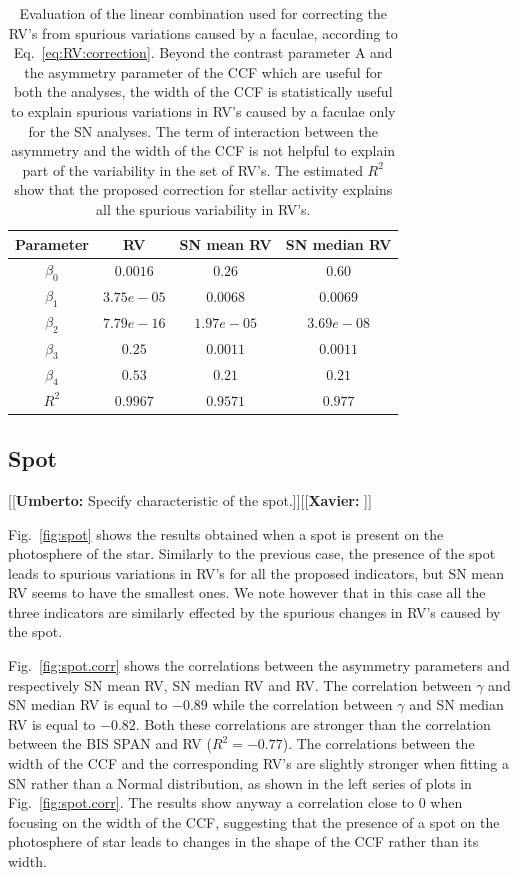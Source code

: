 \documentclass[11pt, oneside]{article}
\newcommand{\xavier}[1]{{\color{blue}[[\textbf{Xavier: }#1]]}}
\newcommand{\umberto}[1]{{\color{green}[[\textbf{Umberto: }#1]]}}
\begin{document}
\begin{table}
\centering
\begin{tabular}{|c|c|c|c|}
\hline
Parameter          & RV         &   SN mean RV &   SN median RV \\
\hline
$\beta_{0}$            &    $0.0016$    & $0.26$ & $0.60$ \\
\hline
$\beta_{1}$            &    $3.75e-05$    & $0.0068$ & $0.0069$ \\
\hline
$\beta_{2}$            &     $7.79e-16$   &  $1.97e-05$ & $3.69e-08$\\
\hline
$\beta_{3}$            &     $0.25$   &  $0.0011$ & $0.0011$\\
\hline
$\beta_{4}$            &     $0.53$   &  $0.21$ & $0.21$\\
\hline
$R^{2}$      &     $0.9967$    &  $0.9571$ & $0.977$  \\
\hline
\end{tabular}
\caption{Evaluation of the linear combination used for correcting the RV's from spurious variations caused by a faculae, according to Eq.~\ref{eq:RV:correction}. Beyond the contrast parameter A and the asymmetry parameter of the CCF which are useful for both the analyses, the width of the CCF is statistically useful to explain spurious variations in RV's caused by a faculae only for the SN analyses. The term of interaction between the asymmetry and the width of the CCF is not helpful to explain part of the variability in the set of RV's. The estimated $R^{2}$ show that the proposed correction for stellar activity explains all the spurious variability in RV's.}
\label{table:faculae.test}
\end{table}

\subsection{Spot} \label{sec:soap.spot}

\umberto{Specify characteristic of the spot.}\xavier{}

Fig.~\ref{fig:spot} shows the results obtained when a spot is present on the photosphere of the star. Similarly to the previous case, the presence of the spot leads to spurious variations in RV's for all the proposed indicators, but SN mean RV seems to have the smallest ones. We note however that in this case all the three indicators are similarly effected by the spurious changes in RV's caused by the spot.

Fig.~\ref{fig:spot.corr} shows the correlations between the asymmetry parameters and respectively SN mean RV, SN median RV and RV. The correlation between $\gamma$ and SN median RV is equal to $-0.89$ while the correlation between $\gamma$ and SN median RV is equal to $-0.82$. Both these correlations are stronger than the correlation between the BIS SPAN and RV ($R^2=-0.77$). The correlations between the width of the CCF and the corresponding RV's are slightly stronger when fitting a SN rather than a Normal distribution, as shown in the left series of plots in Fig.~\ref{fig:spot.corr}. The results show anyway a correlation close to $0$ when focusing on the width of the CCF, suggesting that the presence of a spot on the photosphere of star leads to changes in the shape of the CCF rather than its width.
\end{document}
